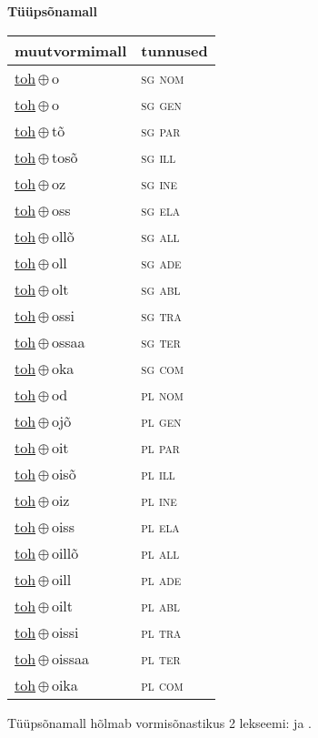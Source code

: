 

\vspace{3.5em}
\noindent \begin{minipage}{\textwidth}
\noindent \textbf{Tüüpsõnamall \,}\\

\begin{sideways}
\begin{tabular}{l l}
muutvormimall & tunnused \\
\hline
\underline{toh}\,$\oplus$\,o & \textsc{ sg nom } \\
\underline{toh}\,$\oplus$\,o & \textsc{ sg gen } \\
\underline{toh}\,$\oplus$\,tõ & \textsc{ sg par } \\
\underline{toh}\,$\oplus$\,tosõ & \textsc{ sg ill } \\
\underline{toh}\,$\oplus$\,oz & \textsc{ sg ine } \\
\underline{toh}\,$\oplus$\,oss & \textsc{ sg ela } \\
\underline{toh}\,$\oplus$\,ollõ & \textsc{ sg all } \\
\underline{toh}\,$\oplus$\,oll & \textsc{ sg ade } \\
\underline{toh}\,$\oplus$\,olt & \textsc{ sg abl } \\
\underline{toh}\,$\oplus$\,ossi & \textsc{ sg tra } \\
\underline{toh}\,$\oplus$\,ossaa & \textsc{ sg ter } \\
\underline{toh}\,$\oplus$\,oka & \textsc{ sg com } \\
\underline{toh}\,$\oplus$\,od & \textsc{ pl nom } \\
\underline{toh}\,$\oplus$\,ojõ & \textsc{ pl gen } \\
\underline{toh}\,$\oplus$\,oit & \textsc{ pl par } \\
\underline{toh}\,$\oplus$\,oisõ & \textsc{ pl ill } \\
\underline{toh}\,$\oplus$\,oiz & \textsc{ pl ine } \\
\underline{toh}\,$\oplus$\,oiss & \textsc{ pl ela } \\
\underline{toh}\,$\oplus$\,oillõ & \textsc{ pl all } \\
\underline{toh}\,$\oplus$\,oill & \textsc{ pl ade } \\
\underline{toh}\,$\oplus$\,oilt & \textsc{ pl abl } \\
\underline{toh}\,$\oplus$\,oissi & \textsc{ pl tra } \\
\underline{toh}\,$\oplus$\,oissaa & \textsc{ pl ter } \\
\underline{toh}\,$\oplus$\,oika & \textsc{ pl com } \\
\end{tabular}
\end{sideways}
\label{tab:tüüpsõnamall-toho}

\end{minipage}

 
\vspace{1em}
\noindent Tüüpsõnamall  hõlmab vormisõnastikus 2 lekseemi:  ja .
